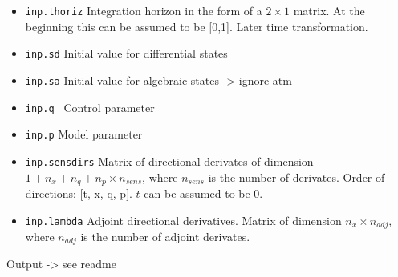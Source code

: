\documentclass[12pt]{article}
\begin{document}
\begin{itemize}
    \item \texttt{inp.thoriz} Integration horizon in the form of a $2 \times 1$ matrix. At the beginning  this can be assumed to be [0,1]. Later time transformation.
    \item \texttt{inp.sd} Initial value for differential states 
    \item \texttt{inp.sa} Initial value for algebraic states -> ignore atm
    \item \texttt{inp.q } Control parameter
    \item \texttt{inp.p} Model parameter
    \item \texttt{inp.sensdirs} Matrix of directional derivates of dimension $1+n_x+n_q+n_p \times n_{sens}$, where $n_{sens}$ is the number of derivates.
         Order of directions: [t, x, q, p]. $t$ can be assumed to be 0.
    \item \texttt{inp.lambda} Adjoint directional derivatives. 
           Matrix of dimension $n_x \times n_{adj}$, where $n_{adj}$ is the number of adjoint derivates.
\end{itemize}


Output -> see readme
\end{document}
